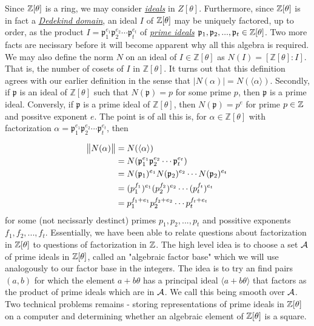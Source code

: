     Since $\mathbb{Z}[\theta]$ is a ring, we may consider \hyperref[ideal]{\textit{ideals}} in $Z[\theta]$. Furthermore, since $\mathbb{Z}[\theta]$ is in fact a \hyperref[dedekind]{\textit{Dedekind domain}}, an ideal $I$ of $\mathbb{Z}[\theta]$ may be uniquely factored, up to order, as the product $I = \mathfrak{p}_1^{e_1} \mathfrak{p}_2^{e_2} \cdots \mathfrak{p}_t^{e_t}$ of \hyperref[primeideal]{\textit{prime ideals}} $ \mathfrak{p}_1, \mathfrak{p}_2, ... , \mathfrak{p}_t \in \mathbb{Z}[\theta]$. Two more facts are necissary before it will become apparent why all this algebra is required. We may also define the norm $N$ on an ideal of $I \in \mathbb{Z}[\theta]$ as $N(I) = [\mathbb{Z}[\theta]: I]$. That is, the number of cosets of $I$ in $\mathbb{Z}[\theta]$. It turns out that this definition agrees with our earlier definition in the sense that $\mid N(\alpha)\mid  = N(\langle \alpha \rangle )$. Secondly, if $\mathfrak{p}$ is an ideal of $\mathbb{Z}[\theta]$ such that $N(\mathfrak{p}) = p$ for some prime $p$, then $\mathfrak{p}$ is a prime ideal. Conversly, if $\mathfrak{p}$ is a prime ideal of $\mathbb{Z}[\theta]$, then $N(\mathfrak{p}) = p^e$ for prime $p \in \mathbb{Z}$ and possitve exponent $e$. The point is of all this is, for $\alpha \in \mathbb{Z}[\theta]$ with factorization $\alpha = \mathfrak{p}_1^{e_1} \mathfrak{p}_2^{e_2} \cdots \mathfrak{p}_t^{e_t}$, then

    \begin{align*}
      \norm{N(\alpha)} & = N(\langle \alpha \rangle) \\
      &=N(\mathfrak{p}_1^{e_1} \mathfrak{p}_2^{e_2} \cdots \mathfrak{p}_t^{e_t}) \\
      &=N(\mathfrak{p}_1)^{e_1}N(\mathfrak{p}_2)^{e_2} \cdots N(\mathfrak{p}_2)^{e_t} \\
      &=(p_1^{f_1})^{e_1}(p_2^{f_2})^{e_2} \cdots (p_t^{f_t})^{e_t} \\
      &=p_1^{f_1 + e_1}p_2^{f_2 + e_2} \cdots p_t^{f_t + e_t}
    \end{align*}
    for some (not necissarly destinct) primes $p_1, p_2, ..., p_t$ and possitive exponents $f_1,f_2,...,f_t$. Essentially, we have been able to relate questions about factorization in $\mathbb{Z}[\theta]$ to questions of factorization in $\mathbb{Z}$. The high level idea is to choose a set $\mathcal{A}$ of prime ideals in $\mathbb{Z}[\theta]$, called an "algebraic factor base" which we will use analogously to our factor base in the integers. The idea is to try an find pairs $(a,b)$ for which the element $a + b \theta$ has a principal ideal $\langle a+ b \theta \rangle$ that factors as the product of prime ideals which are in $\mathcal{A}$. We call this being smooth over $\mathcal{A}$. Two technical problems remains - storing representations of prime ideals in $\mathbb{Z}[\theta]$ on a computer and determining whether an algebraic element of $\mathbb{Z}[\theta]$ is a square. \\ 

